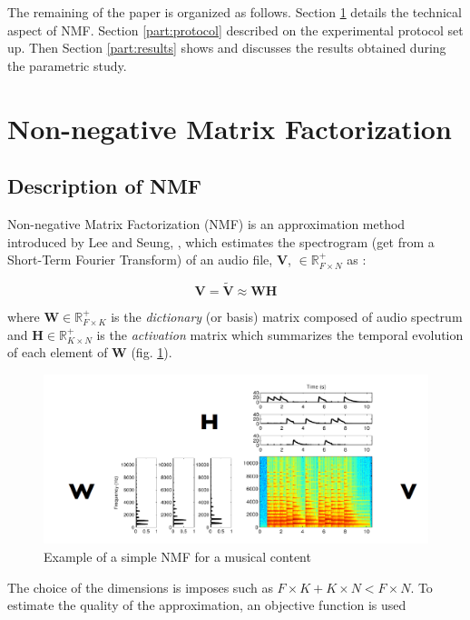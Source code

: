 \documentclass[twocolumn,a4paper,10pt]{article}
\begin{document}
The remaining of the paper is organized as follows. Section \ref{part:nmf} details the technical aspect of NMF. Section \ref{part:protocol} described on the experimental protocol set up. Then Section \ref{part:results} shows and discusses the results obtained during the parametric study.

\section{Non-negative Matrix Factorization}\label{part:nmf}
\subsection{Description of NMF}
Non-negative Matrix Factorization (NMF) is an approximation method introduced by Lee and Seung, \cite{lee_learning_1999}, which estimates the spectrogram (get from a Short-Term Fourier Transform) of an audio file, $\mathbf{V}$, $\in \mathbb{R}^+_{F \times N}$ as :

\begin{equation}\label{eq:nmf}
\mathbf{V} = \mathbf{\tilde{V}} \approx \mathbf{WH}
\end{equation}

where $\mathbf{W} \in \mathbb{R}^+_{F \times K}$ is the \textit{dictionary} (or basis) matrix composed of audio spectrum and $\mathbf{H} \in \mathbb{R}^+_{K \times N}$ is the \textit{activation} matrix which summarizes the temporal evolution of each element of $\mathbf{W}$ (fig.  \ref{fig:example_NMF}).

\begin{figure}[hbtp]
\centering
\includegraphics[width=0.9\linewidth]{../image/illustration_NMF.PNG}
\caption{Example of a simple NMF  for a musical content \cite{bertin_les_2009}}
\label{fig:example_NMF}
\end{figure}

The choice of the dimensions is imposes such as $F\times K + K \times N < F \times N$. To estimate the quality of the approximation, an objective function is used
\end{document}
